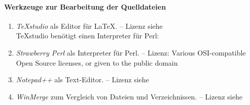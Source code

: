 \paragraph{Werkzeuge zur Bearbeitung der Quelldateien}%

\begin{enumerate}
	\setcounter{enumi}{\value{Enumi}}%

	\item\label{Werkzeug:TeXstudio}\emph{\TeX studio} als Editor für \LaTeX.
	-- Lizenz siehe~\cite{bib:GPLii}\\
	\TeX studio benötigt einen Interpreter für Perl:

	\item\label{Werkzeug:Perl}\emph{Strawberry Perl} als Interpreter für Perl.
	-- Lizenz: Various OSI-compatible Open Source licenses, or given to the public domain

	\item\label{Werkzeug:Notepadpp}\emph{Notepad++} als Text-Editor.
	-- Lizenz siehe~\cite{bib:GPLi}

	\item\label{Werkzeug:WinMerge}\emph{WinMerge} zum Vergleich von Dateien und Verzeichnissen.
	-- Lizenz siehe~\cite{bib:GPLi}

	\setcounter{Enumi}{\value{enumi}}%
\end{enumerate}

